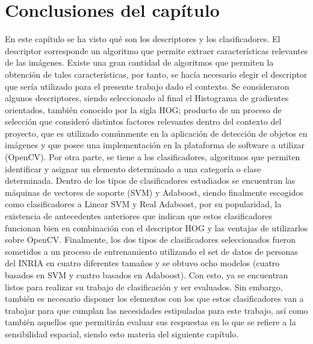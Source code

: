 \section{Conclusiones del capítulo}
\label{caract:conclusiones}


En este capítulo se ha visto qué son los descriptores y los clasificadores. El descriptor corresponde un algoritmo que permite extraer características relevantes de las imágenes. Existe una gran cantidad de algoritmos que permiten la obtención de tales características, por tanto, se hacía necesario elegir el descriptor que sería utilizado para el presente trabajo dado el contexto. Se consideraron algunos descriptores, siendo seleccionado al final el Histograma de gradientes orientados, también conocido por la sigla HOG; producto de un proceso de selección que consideró distintos factores relevantes dentro del contexto del proyecto, que es utilizado comúnmente en la aplicación de detección de objetos en imágenes y que posee una implementación en la plataforma de software a utilizar (OpenCV).
Por otra parte, se tiene a los clasificadores, algoritmos que permiten identificar y asignar un elemento determinado a una categoría  o clase determinada. Dentro de los tipos de clasificadores estudiados se encuentran las máquinas de vectores de soporte (SVM) y Adaboost, siendo finalmente escogidos como clasificadores a Linear SVM y Real Adaboost, por su popularidad, la existencia de antecedentes anteriores que indican que estos clasificadores funcionan bien en combinación con el descriptor HOG y las ventajas de utilizarlos sobre OpenCV.
Finalmente, los dos tipos de clasificadores seleccionados fueron sometidos a un proceso de entrenamiento utilizando el set de datos de personas del INRIA en cuatro diferentes tamaños y se obtuvo ocho modelos (cuatro basados en SVM y cuatro basados en Adaboost). Con esto, ya se encuentran listos para realizar su trabajo de clasificación y ser evaluados. Sin embargo, también es necesario disponer los elementos con los que estos clasificadores van a trabajar para que cumplan las necesidades estipuladas para este trabajo, así como también aquellos que permitirán evaluar sus respuestas en lo que se refiere a la sensibilidad espacial, siendo esto materia del siguiente capítulo.


